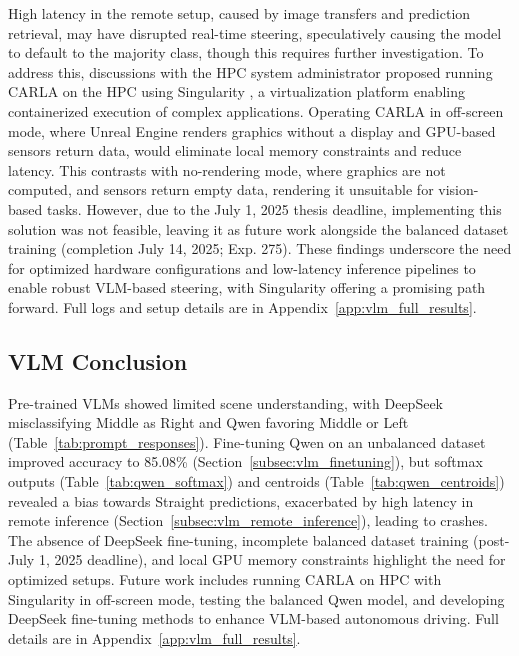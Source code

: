 High latency in the remote setup, caused by image transfers and prediction retrieval, may have disrupted real-time steering, speculatively causing the model to default to the majority class, though this requires further investigation. To address this, discussions with the HPC system administrator proposed running CARLA on the HPC using Singularity \cite{kurtzer2017singularity}, a virtualization platform enabling containerized execution of complex applications. Operating CARLA in off-screen mode, where Unreal Engine renders graphics without a display and GPU-based sensors return data, would eliminate local memory constraints and reduce latency. This contrasts with no-rendering mode, where graphics are not computed, and sensors return empty data, rendering it unsuitable for vision-based tasks. However, due to the July 1, 2025 thesis deadline, implementing this solution was not feasible, leaving it as future work alongside the balanced dataset training (completion July 14, 2025; Exp. 275). These findings underscore the need for optimized hardware configurations and low-latency inference pipelines to enable robust VLM-based steering, with Singularity offering a promising path forward. Full logs and setup details are in Appendix~\ref{app:vlm_full_results}.


\subsection{VLM Conclusion}
\label{subsec:vlm_conclusion}
Pre-trained VLMs showed limited scene understanding, with DeepSeek misclassifying Middle as Right and Qwen favoring Middle or Left (Table~\ref{tab:prompt_responses}). Fine-tuning Qwen on an unbalanced dataset improved accuracy to 85.08\% (Section~\ref{subsec:vlm_finetuning}), but softmax outputs (Table~\ref{tab:qwen_softmax}) and centroids (Table~\ref{tab:qwen_centroids}) revealed a bias towards Straight predictions, exacerbated by high latency in remote inference (Section~\ref{subsec:vlm_remote_inference}), leading to crashes. The absence of DeepSeek fine-tuning, incomplete balanced dataset training (post-July 1, 2025 deadline), and local GPU memory constraints highlight the need for optimized setups. Future work includes running CARLA on HPC with Singularity in off-screen mode, testing the balanced Qwen model, and developing DeepSeek fine-tuning methods to enhance VLM-based autonomous driving. Full details are in Appendix~\ref{app:vlm_full_results}.


